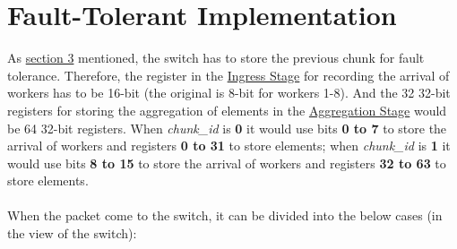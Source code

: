 \documentclass[a4paper,11pt]{article}
\begin{document}
\section{Fault-Tolerant Implementation}
\label{sec:fti}
As \hyperref[sec:ftap]{section 3} mentioned, the switch has to store the previous chunk for fault tolerance. Therefore, the register in the \hyperref[ingstg]{Ingress Stage} for recording the arrival of workers has to be 16-bit (the original is 8-bit for workers 1-8). And the 32 32-bit registers for storing the aggregation of elements in the \hyperref[aggstg]{Aggregation Stage} would be 64 32-bit registers. When \textit{chunk\_id} is \textbf{0} it would use bits \textbf{0 to 7} to store the arrival of workers and registers \textbf{0 to 31} to store elements; when \textit{chunk\_id} is \textbf{1} it would use bits \textbf{8 to 15} to store the arrival of workers and registers \textbf{32 to 63} to store elements. \\\\
When the packet come to the switch, it can be divided into the below cases (in the view of the switch):
\end{document}
